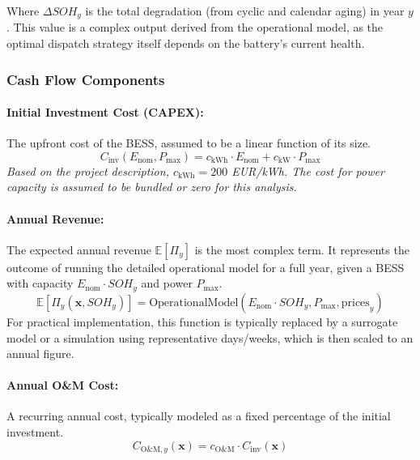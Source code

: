 \documentclass[11pt, a4paper]{article}
\begin{document}
Where $\Delta SOH_y$ is the total degradation (from cyclic and calendar aging) in year $y$. This value is a complex output derived from the operational model, as the optimal dispatch strategy itself depends on the battery's current health.

\subsubsection{Cash Flow Components}

\paragraph{Initial Investment Cost (CAPEX):}
The upfront cost of the BESS, assumed to be a linear function of its size.
\begin{equation}
C_{\text{inv}}(E_{\text{nom}}, P_{\text{max}}) = c_{\text{kWh}} \cdot E_{\text{nom}} + c_{\text{kW}} \cdot P_{\text{max}}
\end{equation}
\textit{Based on the project description, $c_{\text{kWh}} = 200$ EUR/kWh. The cost for power capacity is assumed to be bundled or zero for this analysis.}

\paragraph{Annual Revenue:}
The expected annual revenue $\mathbb{E}[\Pi_y]$ is the most complex term. It represents the outcome of running the detailed operational model for a full year, given a BESS with capacity $E_{\text{nom}} \cdot SOH_y$ and power $P_{\text{max}}$.
\begin{equation}
\mathbb{E}[\Pi_y(\mathbf{x}, SOH_y)] = \text{OperationalModel}(E_{\text{nom}} \cdot SOH_y, P_{\text{max}}, \text{prices}_y)
\end{equation}
For practical implementation, this function is typically replaced by a surrogate model or a simulation using representative days/weeks, which is then scaled to an annual figure.

\paragraph{Annual O\&M Cost:}
A recurring annual cost, typically modeled as a fixed percentage of the initial investment.
\begin{equation}
C_{\text{O\&M},y}(\mathbf{x}) = c_{\text{O\&M}} \cdot C_{\text{inv}}(\mathbf{x})
\end{equation}
\end{document}
